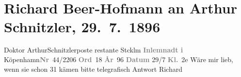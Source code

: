 

         \renewcommand{\erwaehnteOrte}{Orte: Kopenhagen, Stockholm}
         \renewcommand{\erwaehnteWerke}{}
               \section[Richard Beer-Hofmann an Arthur Schnitzler, 29. 7. 1896]{ Richard Beer-Hofmann an Arthur Schnitzler, 29. 7. 1896}\nopagebreak{}\rehead{ }\begin{ledgroupsized}[t]{13cm}\normalsize\beginnumbering \toendnotes[C]{\smallbreak\pagebreak[2]} 
\pstart{}{\pb}Doktor Arthur\pend{}\pstart{}Schnitzler\pend{}\pstart{}poste restante Stcklm\pend{}{\bigskip}\pstart
           {\pb}\textcolor{gray}{\textbf{Inlemnadt i}}{ }Köpenhamn\textcolor{gray}{\textbf{Nr}} 44/2206{ }\textcolor{gray}{\textbf{Ord}} 18{ }\textcolor{gray}{\textbf{År}} 96{ }\textcolor{gray}{\textbf{Datum}}{ }29/7{ }\textcolor{gray}{\textbf{Kl.}} 2e\pend
           \pstart
           Wäre mir lieb, wenn sie schon 31 kämen bitte telegrafisch Antwort\pend
           \pstart \spacefill\mbox{Richard}\pend{}
         
         \endnumbering{}\end{ledgroupsized}  \newcommand{\dateiname}{L00573}\newcommand{\titel}{Richard Beer-Hofmann an Arthur Schnitzler, 29. 7. 1896}\newcommand{\editorInnen}{Martin Anton Müller und Gerd-Hermann Susen}
      